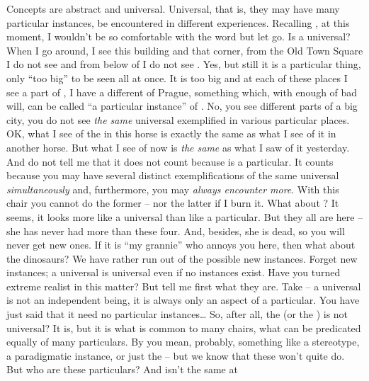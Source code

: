 \begin{itemize}\MyLPar
\ans Concepts are abstract and universal. Universal, that is, they may have 
many particular instances, be encountered in different experiences.
\que Recalling , at this moment, I wouldn't be so 
comfortable with the 
word  but let go. Is  a universal?
When I go around, I see this building and that corner, from the Old Town 
Square I do not see  and from below of  
I do not see .
\ans Yes, but still it is a particular thing, only ``too big'' to be seen 
all at once.
\que It is too big and at each of these places I see a 
part of , I have a different  of Prague, something 
which, with enough of bad will, can be called ``a particular instance'' of 
.
\ans No, you see different parts of a big city, you do not see {\em the 
same} universal exemplified in various particular places.
\que OK, what I see of the  in this  horse is exactly the same 
as what I see of it in another horse. But what I see of  
now is {\em the same} as what I saw of it yesterday. And do not tell me 
that it does not count because  is a particular.
\ans It counts because  you may have several 
distinct exemplifications of the same universal {\em simultaneously} and, 
furthermore, you may {\em always encounter more}. With this chair you cannot 
do the former -- nor the latter if I burn it.
\que What about ? It seems, it looks more 
like a universal than like a particular. But they all are here -- she has 
never had more than these four. And, besides, she is dead, so you will never 
get new ones. If it is ``my grannie'' who annoys you here, then what 
about the dinosaurs? We have rather run out of the possible new
instances.
\ans Forget new instances; a universal is universal even if no instances exist.
\que Have you turned extreme realist in this matter? But tell me first what they are.
\ans
Take  -- a universal is not an 
independent being, it is always only an aspect of a particular.
\que You have just said that it need no particular instances\ldots
So, after all, the  (or the ) is not universal?
\ans It is, but it is what is common to many chairs, what can be predicated
equally of many particulars.
\que By  you mean, probably, something like a stereotype, 
a paradigmatic instance, or just the  -- but we know that these
won't quite do. 
But who are these particulars? And isn't  the same at 

\end{itemize}
